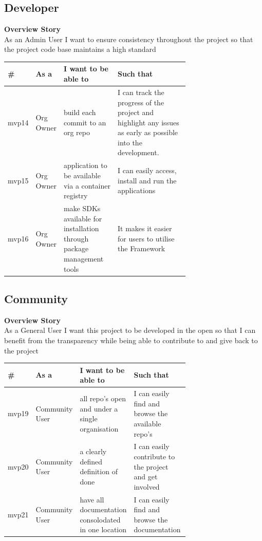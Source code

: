\subsection{Developer}
\textbf{Overview Story}
\\As an Admin User I want to ensure consistency throughout the project so that the project code base maintains a high standard

\begin{table}[!ht]
\begin{tabular}{|l|l|p{0.3\linewidth}|p{0.4\linewidth}|}
\hline
\textbf{\#} & \textbf{As a} & \textbf{I want to be able to} & \textbf{Such that} \\ \hline
mvp14 & Org Owner & build each commit to an org repo & I can track the progress of the project and highlight any issues as early as possible into the development. \\ \hline
mvp15 & Org Owner & application to be available via a container registry & I can easily access, install and run the applications \\ \hline
mvp16 & Org Owner & make SDKs available for installation through package management tools & It makes it easier for users to utilise the Framework \\ \hline
\end{tabular}
\end{table}

\subsection{Community}
\label{sub:communitystor}
\textbf{Overview Story}
\\As a General User I want this project to be developed in the open so that I can benefit from the transparency while being able to contribute to and give back to the project

\begin{table}[!ht]
\begin{tabular}{|l|l|p{0.3\linewidth}|p{0.4\linewidth}|}
\hline
\textbf{\#} & \textbf{As a}  & \textbf{I want to be able to}                       & \textbf{Such that}                                      \\ \hline
mvp19       & Community User & all repo's open and under a single organisation     & I can easily find and browse the available repo's       \\ \hline
mvp20       & Community User & a clearly defined definition of done                & I can easily contribute to the project and get involved \\ \hline
mvp21       & Community User & have all documentation consolodated in one location & I can easily find and browse the documentation          \\ \hline
\end{tabular}
\end{table}

